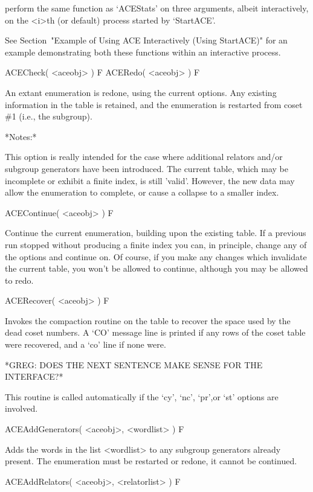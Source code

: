perform the same function as `ACEStats'  on  three  arguments,  albeit
interactively,  on  the  <i>th  (or  default)   process   started   by
`StartACE'.

See Section~"Example of Using ACE Interactively (Using StartACE)"  for
an example demonstrating both these functions  within  an  interactive
process.


\>ACECheck( <aceobj> ) F
\>ACERedo( <aceobj> ) F

An extant  enumeration is redone,  using the current  options.  Any
existing information in the table  is retained, and the enumeration is
restarted from coset \#1 (i.e., the subgroup).

*Notes:*

This option is really intended  for the case where additional relators
and/or subgroup  generators have been introduced.   The current table,
which may be  incomplete or exhibit a finite  index, is still 'valid'.
However, the new data may  allow the enumeration to complete, or cause
a collapse to a smaller index.

\>ACEContinue( <aceobj> ) F

Continue the  current enumeration,  building upon the  existing table.
If a previous run stopped without producing a finite index you can, in
principle, change any  of the options and continue  on.  Of course,
if you make any changes  which invalidate the current table, you won't
be allowed to continue, although you may be allowed to redo.


\>ACERecover( <aceobj> ) F

Invokes the compaction routine on the table to recover the space  used
by the dead coset numbers. A `CO' message line is printed if any  rows
of the coset table were recovered, and a `co' line if none were.

*GREG: DOES THE NEXT SENTENCE MAKE SENSE FOR THE INTERFACE?*

This routine is  called automatically if the `cy',  `nc', `pr',or `st'
options are involved.


\>ACEAddGenerators( <aceobj>, <wordlist> ) F

Adds the words in the list <wordlist> to any subgroup generators already
present.
The enumeration must be restarted or redone, it cannot be continued.

\>ACEAddRelators( <aceobj>, <relatorlist> ) F

